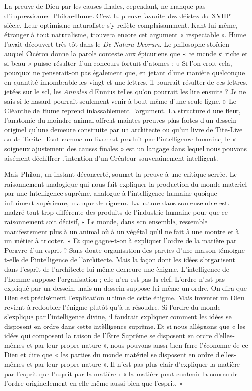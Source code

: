 La preuve de Dieu par les causes finales, cependant, ne
manque pas d’impressionner Philon-Hume. C’est la preuve
favorite des déistes du {\footnotesize XVIII}$^\text{e}$ siècle. Leur optimisme
naturaliste s’y reflète complaisamment. Kant lui-même,
étranger à tout naturalisme, trouvera encore cet argument
« respectable ». Hume l’avait découvert très tôt dans le
{\it De Natura Deorum}. Le philosophe stoïcien auquel Cicéron
donne la parole conteste aux épicuriens que « ce monde
si riche et si beau » puisse résulter d’un concours fortuit
d’atomes : « Si l’on croit cela, pourquoi ne penserait-on
pas également que, en jetant d’une manière quelconque
en quantité innombrable les vingt et une lettres, il pourrait
résulter de ces lettres, jetées sur le sol, les {\it Annales}
d’Ennius telles qu’on pourrait les lire ensuite ? Je ne sais
si le hasard pourrait seulement venir à bout même d’une
seule ligne. » Le Cléanthe de Hume reprend inlassablement
l’argument. La structure d’une fleur, l’anatomie du
moindre animal offrent maintes preuves plus fortes d’un
dessein originel qu’une demeure construite par un architecte ou qu’un livre de Tite-Live ou de Tacite. Tout
comme un livre est produit par l'intelligence humaine,
le « soigneux ajustement des causes finales » est un langage
dans lequel nous pouvons aisément déchiffrer l'intention
d’un Créateur souverainement intelligent.

Mais Philon, un instant déconcerté, soumet la preuve à
une critique serrée. Le raisonnement analogique qui nous
fait expliquer la production du monde matériel par une
Intelligence suprême, analogue à l'intelligence humaine
quoique infiniment supérieure, manque de rigueur. La
nature dans son ensemble est. malgré tout trop différente
des produits de l’industrie humaine pour que ce raisonnement soit décisif, « Le monde, dans son ensemble,
ressemble manifestement plus à un animal où à un végétal
qu’il ne fait à une montre et à un métier à tricoter. » Et
que gagne-t-on à expliquer l’ordre de la matière par
Pœuvre d’un esprit ? Sans doute organisation des parties
d’une maison témoigne-t-elle de Pintelligence de l’architecte. Mais la façon dont les idées s’organisent dans l’esprit
de l’architecte lui-même demeure une énigme. L’intelligence de l’homme suppose l’organisation ; elle n’en est
pas la clef. L’ordre n’est pas expliqué par un dessein,
mais un dessein suppose lui-même un ordre. On dira que
Dieu est précisément l'explication ultime de cette énigme.
Maïs inventer un Dieu revient à redoubler l’énigme plutôt
qu’à la résoudre. Si l’ordre du monde s’explique par l’intelligence divine, il faudrait expliquer comment les idées
se disposent en ordre dans cette intèlligence suprême.
Et si nous alléguons que « les idées qui composent la raison
de l’Être Suprême se disposent en ordre d’elles-mêmes et
par leur propre nature », nous pouvons aussi bien faire
l’économie de ce Dieu et dire que « les parties du monde
matériel se disposent en ordre d’elles-mêmes et par leur
propre nature ». Il n’est pas plus clair d'expliquer la
matière par l'esprit que l’esprit par la matière :  « la
matière peut contenir la source de l’ordre originellement
en elle-même aussi bien que l'esprit. » 

